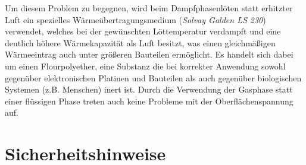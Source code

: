 \documentclass{\basedir/fablab-document}
\begin{document}
	Um diesem Problem zu begegnen, wird beim Dampfphasenl{\"o}ten statt erhitzter Luft ein spezielles W{\"a}rme{\"u}bertragungsmedium (\textit{Solvay Galden LS 230}) verwendet, welches bei der gew{\"u}nschten L{\"o}ttemperatur verdampft und eine deutlich h{\"o}here W{\"a}rmekapazit{\"a}t als Luft besitzt, was einen gleichm{\"a}{\ss}igen W{\"a}rmeeintrag auch unter gr{\"o}{\ss}eren Bauteilen erm{\"o}glicht. Es handelt sich dabei um einen Flourpolyether, eine Substanz die bei korrekter Anwendung sowohl gegen{\"u}ber elektronischen Platinen und Bauteilen als auch gegen{\"u}ber biologischen Systemen (z.B. Menschen) inert ist. Durch die Verwendung der Gasphase statt einer fl{\"u}ssigen Phase treten auch keine Probleme mit der Oberfl{\"a}chenspannung auf.
	
	\section{Sicherheitshinweise}
	
\end{document}
